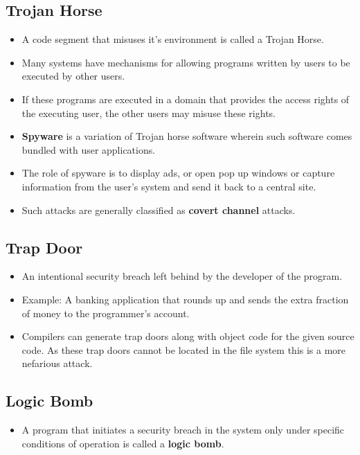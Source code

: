 \documentclass{article}
\theoremstyle{plain}
\theoremstyle{definition}
\begin{document}
\subsection{Trojan Horse}
\begin{itemize}
    \item A code segment that misuses it's environment is called a Trojan Horse. 
    
    \item Many systems have mechanisms for allowing programs written by users to be executed by other users. 

    \item If these programs are executed in a domain that provides the access rights of the executing user, the other users may misuse these rights.
    
    \item \textbf{Spyware} is a variation of Trojan horse software wherein such software comes bundled with user applications. 
    
    \item The role of spyware is to display ads, or open pop up windows or capture information from the user's system and send it back to a central site. 
    
    \item Such attacks are generally classified as \textbf{covert channel} attacks. 
\end{itemize}

\subsection{Trap Door}
\begin{itemize}
    \item An intentional security breach left behind by the developer of the program. 
    
    \item Example: A banking application that rounds up and sends the extra fraction of money to the programmer's account. 
    
    \item Compilers can generate trap doors along with object code for the given source code. As these trap doors cannot be located in the file system this is a more nefarious attack. 
\end{itemize}

\subsection{Logic Bomb}
\begin{itemize}
    \item A program that initiates a security breach in the system only under specific conditions of operation is called a \textbf{logic bomb}. 
\end{itemize}
\end{document}
